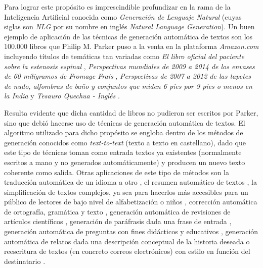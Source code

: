 Para lograr este propósito es imprescindible profundizar en la rama de la Inteligencia Artificial conocida como \textit{Generación de Lenguaje Natural} (cuyas siglas son \textit{NLG} por su nombre en inglés \textit{Natural Language Generation}). Un buen ejemplo de aplicación de las técnicas de generación automática de textos son los 100.000 libros que Philip M. Parker puso a la venta en la plataforma \textit{Amazon.com} incluyendo títulos de temáticas tan variadas como \textit{El libro oficial del paciente sobre la estenosis espinal} \citep{parker2002official}, \textit{Perspectivas mundiales de 2009 a 2014 de los envases de 60 miligramos de Fromage Frais} \citep{parkerfromage},  \textit{Perspectivas de 2007 a 2012 de las tapetes de nudo, alfombras de baño y conjuntos que miden 6 pies por 9 pies o menos en la India} \citep{parkerrugs} y \textit{Tesauro Quechua - Inglés} \citep{parkerquechua}.

Resulta evidente que dicha cantidad de libros no pudieron ser escritos por Parker, sino que debió hacerse uso de técnicas de generación automática de textos. El algoritmo utilizado para dicho propósito se engloba dentro de los métodos de generación conocidos como \textit{text-to-text} (texto a texto en castellano), dado que este tipo de técnicas toman como entrada textos ya existentes (normalmente escritos a mano y no generados automáticamente) y producen un nuevo texto coherente como salida. Otras aplicaciones de este tipo de métodos son la traducción automática de un idioma a otro \citep{hutchins2009introduction, oettinger2013automatic}, el resumen automático de textos \citep{mani2001automatic, nenkova2011automatic}, la simplificación de textos complejos, ya sea para hacerlos más accesibles para un público de lectores de bajo nivel de alfabetización \citep{siddharthan2014survey, bautista2011empirical} o niños \citep{macdonald2016summarising}, corrección automática de ortografía, gramática y texto \citep{kukich1992techniques, ng2014conll}, generación automática de revisiones de artículos científicos \citep{bartoli2016your}, generación de paráfrasis dada una frase de entrada \citep{bannard2005paraphrasing}, generación automática de preguntas con fines didácticos y educativos \citep{brown2005automatic}, generación automática de relatos dada una descripción conceptual de la historia deseada \citep{gervas2004story} o reescritura de textos (en concreto correos electrónicos) con estilo en función del destinatario \citep{mitfg}.


